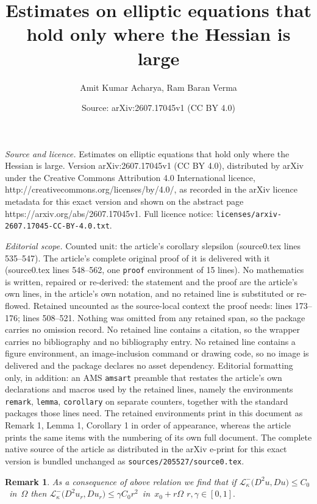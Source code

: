 \documentclass[10pt,a4paper]{amsart}
\title{Estimates on elliptic equations that hold only where the Hessian is large}
\author{Amit Kumar Acharya, Ram Baran Verma}
\date{Source: arXiv:2607.17045v1 (CC BY 4.0)}
\newtheorem{remark}{Remark}
\begin{document}
\maketitle

\noindent\emph{Source and licence.} Estimates on elliptic equations that hold only where the Hessian is large. Version arXiv:2607.17045v1 (CC BY 4.0), distributed by arXiv under the Creative Commons Attribution 4.0 International licence, http://creativecommons.org/licenses/by/4.0/, as recorded in the arXiv licence metadata for this exact version and shown on the abstract page https://arxiv.org/abs/2607.17045v1. Full licence notice: \texttt{licenses/arxiv-2607.17045-CC-BY-4.0.txt}.\par\smallskip

\noindent\textit{Editorial scope.} Counted unit: the article's corollary slepsilon (source0.tex lines 535--547). The article's complete original proof of it is delivered with it (source0.tex lines 548--562, one \texttt{proof} environment of 15 lines). No mathematics is written, repaired or re-derived: the statement and the proof are the article's own lines, in the article's own notation, and no retained line is substituted or re-flowed.  Retained uncounted as the source-local context the proof needs: lines 173--176; lines 508--521.  Nothing was omitted from any retained span, so the package carries no omission record.  No retained line contains a citation, so the wrapper carries no bibliography and no bibliography entry.  No retained line contains a figure environment, an image-inclusion command or drawing code, so no image is delivered and the package declares no asset dependency.  Editorial formatting only, in addition: an AMS \texttt{amsart} preamble that restates the article's own declarations and macros used by the retained lines, namely the environments \texttt{remark}, \texttt{lemma}, \texttt{corollary} on separate counters, together with the standard packages those lines need.  The retained environments print in this document as Remark 1, Lemma 1, Corollary 1 in order of appearance, whereas the article prints the same items with the numbering of its own full document.  The complete native source of the article as distributed in the arXiv e-print for this exact version is bundled unchanged as \texttt{sources/205527/source0.tex}.
\begin{remark}\label{remsc}
As a consequence of above relation we find that if $\mathcal{L}_{\kappa}^{-}\big(D^{2}u,Du\big)\leq C_{0}$~in~$\Omega$ then 
$\mathcal{L}_{\kappa}^{-}\big(D^{2}u_{r},Du_{r}\big)\leq \gamma C_{0}r^{2}$~in~$x_{0}+r\Omega$  $r,\gamma\in[0,1].$ 
\end{remark}
\end{document}
